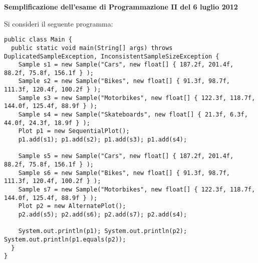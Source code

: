 \documentclass{article}[10pt]
\begin{document}
\begin{center} {\bf Semplificazione dell'esame di Programmazione II del 6 luglio 2012}\end{center}

Si consideri il seguente programma:
%
{\small
\begin{verbatim}
public class Main {
  public static void main(String[] args) throws DuplicatedSampleException, InconsistentSampleSizeException {
    Sample s1 = new Sample("Cars", new float[] { 187.2f, 201.4f, 88.2f, 75.8f, 156.1f } );
    Sample s2 = new Sample("Bikes", new float[] { 91.3f, 98.7f, 111.3f, 120.4f, 100.2f } );		
    Sample s3 = new Sample("Motorbikes", new float[] { 122.3f, 118.7f, 144.0f, 125.4f, 88.9f } );		
    Sample s4 = new Sample("Skateboards", new float[] { 21.3f, 6.3f, 44.0f, 24.3f, 18.9f } );		
    Plot p1 = new SequentialPlot();
    p1.add(s1); p1.add(s2); p1.add(s3); p1.add(s4);

    Sample s5 = new Sample("Cars", new float[] { 187.2f, 201.4f, 88.2f, 75.8f, 156.1f } );
    Sample s6 = new Sample("Bikes", new float[] { 91.3f, 98.7f, 111.3f, 120.4f, 100.2f } );		
    Sample s7 = new Sample("Motorbikes", new float[] { 122.3f, 118.7f, 144.0f, 125.4f, 88.9f } );		
    Plot p2 = new AlternatePlot();
    p2.add(s5); p2.add(s6); p2.add(s7); p2.add(s4);

    System.out.println(p1); System.out.println(p2); System.out.println(p1.equals(p2));
  }
}
\end{verbatim}
}
\end{document}
